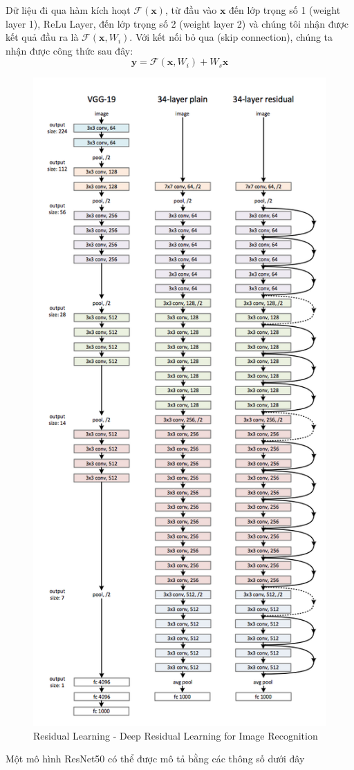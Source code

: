 \documentclass{article}
\begin{document}
	Dữ liệu đi qua hàm kích hoạt $\mathcal{F}(\textbf {x})$, từ đầu vào $\textbf{x}$ đến lớp trọng số 1 (weight layer 1), ReLu Layer, đến lớp trọng số 2 (weight layer 2) và chúng tôi nhận được kết quả đầu ra là $\mathcal{F}(\textbf{x}, {W_i})$. Với kết nối bỏ qua (skip connection), chúng ta nhận được công thức sau đây:
	$$\textbf{y} = \mathcal{F}(\textbf{x}, {W_i}) + W_{s}\textbf{x}$$
	\begin{figure}[H]
		\centering
		\includegraphics[width=0.65\linewidth]{architecture/resnet.png}
		\caption{Residual Learning - Deep Residual Learning for Image Recognition}
		\label{fig:writing-thesis}
	\end{figure}
	Một mô hình ResNet50 có thể được mô tả bằng các thông số dưới đây
\end{document}
